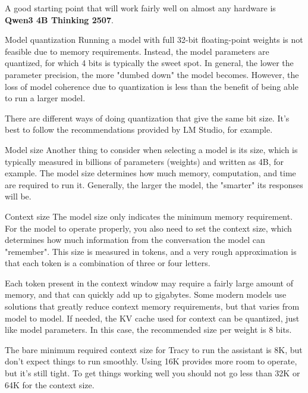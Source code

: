 \documentclass[hidelinks,titlepage,a4paper,twoside]{article}
\begin{document}
A good starting point that will work fairly well on almost any hardware is \textbf{Qwen3 4B Thinking 2507}.

\begin{bclogo}[
noborder=true,
couleur=black!5,
logo=\bclampe
]{Model quantization}
Running a model with full 32-bit floating-point weights is not feasible due to memory requirements. Instead, the model parameters are quantized, for which 4 bits is typically the sweet spot. In general, the lower the parameter precision, the more "dumbed down" the model becomes. However, the loss of model coherence due to quantization is less than the benefit of being able to run a larger model.

There are different ways of doing quantization that give the same bit size. It's best to follow the recommendations provided by LM Studio, for example.
\end{bclogo}

\begin{bclogo}[
noborder=true,
couleur=black!5,
logo=\bclampe
]{Model size}
Another thing to consider when selecting a model is its size, which is typically measured in billions of parameters (weights) and written as 4B, for example. The model size determines how much memory, computation, and time are required to run it. Generally, the larger the model, the "smarter" its responses will be.
\end{bclogo}

\begin{bclogo}[
noborder=true,
couleur=black!5,
logo=\bclampe
]{Context size}
The model size only indicates the minimum memory requirement. For the model to operate properly, you also need to set the context size, which determines how much information from the conversation the model can "remember". This size is measured in tokens, and a very rough approximation is that each token is a combination of three or four letters.

Each token present in the context window may require a fairly large amount of memory, and that can quickly add up to gigabytes. Some modern models use solutions that greatly reduce context memory requirements, but that varies from model to model. If needed, the KV cache used for context can be quantized, just like model parameters. In this case, the recommended size per weight is 8 bits.

The bare minimum required context size for Tracy to run the assistant is 8K, but don't expect things to run smoothly. Using 16K provides more room to operate, but it's still tight. To get things working well you should not go less than 32K or 64K for the context size.
\end{bclogo}
\end{document}

